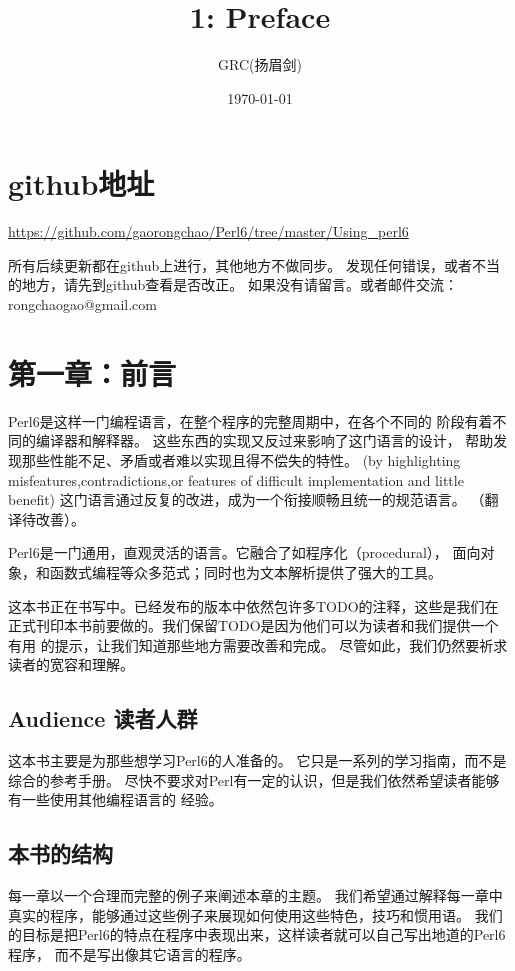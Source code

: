 \documentclass{ctexart}
\title{1: Preface}
\author{GRC(扬眉剑)}
\date{\today}
\begin{document}
\maketitle

\setcounter{tocdepth}{3}
\tableofcontents
\vspace*{1cm}
\section{github地址}
\label{sec-1}

\href{https://github.com/gaorongchao/Perl6/tree/master/Using_perl6}{https://github.com/gaorongchao/Perl6/tree/master/Using\_perl6}

所有后续更新都在github上进行，其他地方不做同步。
发现任何错误，或者不当的地方，请先到github查看是否改正。
如果没有请留言。或者邮件交流：rongchaogao@gmail.com
\section{第一章：前言}
\label{sec-2}

Perl6是这样一门编程语言，在整个程序的完整周期中，在各个不同的
阶段有着不同的编译器和解释器。
这些东西的实现又反过来影响了这门语言的设计，
帮助发现那些性能不足、矛盾或者难以实现且得不偿失的特性。
(by highlighting misfeatures,contradictions,or features
of difficult implementation and little benefit)
这门语言通过反复的改进，成为一个衔接顺畅且统一的规范语言。
（翻译待改善）。

Perl6是一门通用，直观灵活的语言。它融合了如程序化（procedural），
面向对象，和函数式编程等众多范式；同时也为文本解析提供了强大的工具。

这本书正在书写中。已经发布的版本中依然包许多TODO的注释，这些是我们在
正式刊印本书前要做的。我们保留TODO是因为他们可以为读者和我们提供一个有用
的提示，让我们知道那些地方需要改善和完成。
尽管如此，我们仍然要祈求读者的宽容和理解。
\subsection{Audience 读者人群}
\label{sec-2-1}

这本书主要是为那些想学习Perl6的人准备的。
它只是一系列的学习指南，而不是综合的参考手册。
尽快不要求对Perl有一定的认识，但是我们依然希望读者能够有一些使用其他编程语言的
经验。
\subsection{本书的结构}
\label{sec-2-2}

每一章以一个合理而完整的例子来阐述本章的主题。
我们希望通过解释每一章中真实的程序，能够通过这些例子来展现如何使用这些特色，技巧和惯用语。
我们的目标是把Perl6的特点在程序中表现出来，这样读者就可以自己写出地道的Perl6程序，
而不是写出像其它语言的程序。
\end{document}
